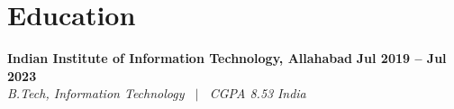 \documentclass[9.5pt,a4paper]{article}
\begin{document}
\section{Education}
  \vspace{-1pt}
  \noindent\textbf{Indian Institute of Information Technology, Allahabad} \hfill \textbf{\small Jul 2019 -- Jul 2023} \\
  \textit{\small B.Tech, Information Technology \ $|$ \ CGPA 8.53} \hfill \textit{\small India}

\end{document}
